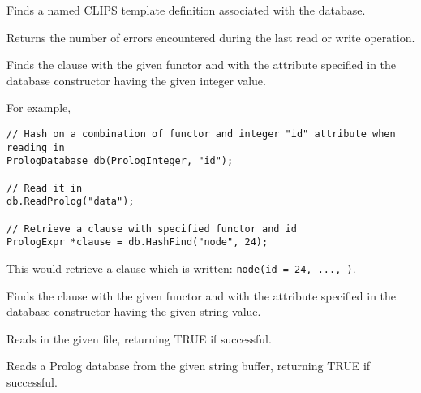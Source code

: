 
Finds a named CLIPS template definition associated with the database.

\label{geterrorcount}


Returns the number of errors encountered during the last read or write operation.



Finds the clause with the given functor and with the attribute specified
in the database constructor having the given integer value.

For example,

\begin{verbatim}
// Hash on a combination of functor and integer "id" attribute when reading in
PrologDatabase db(PrologInteger, "id");

// Read it in
db.ReadProlog("data");

// Retrieve a clause with specified functor and id
PrologExpr *clause = db.HashFind("node", 24);
\end{verbatim}

This would retrieve a clause which is written: {\tt node(id = 24, ..., )}.


Finds the clause with the given functor and with the attribute specified
in the database constructor having the given string value.

\label{databasereadprolog}


Reads in the given file, returning TRUE if successful.



Reads a Prolog database from the given string buffer, returning TRUE if
successful.



